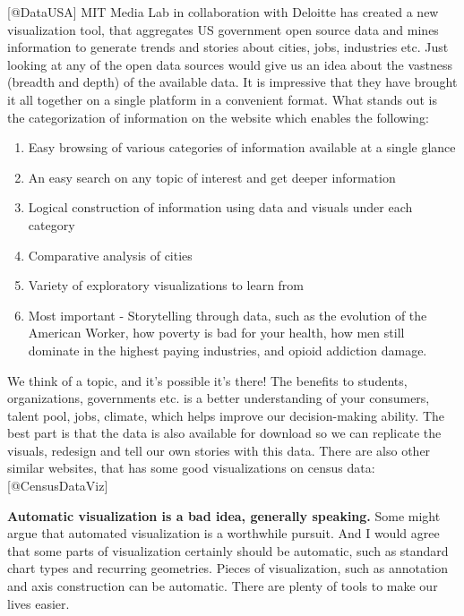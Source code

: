 \documentclass[]{book}
\providecommand{\tightlist}{%
  \setlength{\itemsep}{0pt}\setlength{\parskip}{0pt}}
\theoremstyle{definition}
\theoremstyle{definition}
\theoremstyle{definition}
\theoremstyle{remark}
\begin{document}
{[}@DataUSA{]} MIT Media Lab in collaboration with Deloitte has created
a new visualization tool, that aggregates US government open source data
and mines information to generate trends and stories about cities, jobs,
industries etc. Just looking at any of the open data sources would give
us an idea about the vastness (breadth and depth) of the available data.
It is impressive that they have brought it all together on a single
platform in a convenient format. What stands out is the categorization
of information on the website which enables the following:

\begin{enumerate}
\def\labelenumi{\arabic{enumi}.}
\tightlist
\item
  Easy browsing of various categories of information available at a
  single glance
\item
  An easy search on any topic of interest and get deeper information
\item
  Logical construction of information using data and visuals under each
  category
\item
  Comparative analysis of cities
\item
  Variety of exploratory visualizations to learn from
\item
  Most important - Storytelling through data, such as the evolution of
  the American Worker, how poverty is bad for your health, how men still
  dominate in the highest paying industries, and opioid addiction
  damage.
\end{enumerate}

We think of a topic, and it's possible it's there! The benefits to
students, organizations, governments etc. is a better understanding of
your consumers, talent pool, jobs, climate, which helps improve our
decision-making ability. The best part is that the data is also
available for download so we can replicate the visuals, redesign and
tell our own stories with this data. There are also other similar
websites, that has some good visualizations on census data:
{[}@CensusDataViz{]}

\textbf{Automatic visualization is a bad idea, generally speaking.} Some
might argue that automated visualization is a worthwhile pursuit. And I
would agree that some parts of visualization certainly should be
automatic, such as standard chart types and recurring geometries. Pieces
of visualization, such as annotation and axis construction can be
automatic. There are plenty of tools to make our lives easier.
\end{document}
